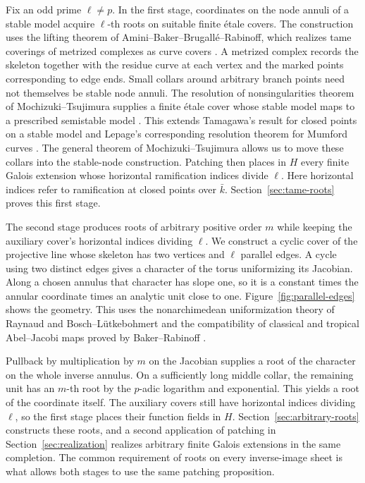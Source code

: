 Fix an odd prime $\ell\ne p$. In the first stage, coordinates on the
node annuli of a stable model acquire $\ell$-th roots on suitable
finite \'etale covers. The construction uses the lifting theorem of
Amini--Baker--Brugall\'e--Rabinoff, which realizes tame coverings of
metrized complexes as curve covers \cite[Theorem~7.7]{ABBR}.
A metrized complex records the skeleton together with the residue
curve at each vertex and the marked points corresponding to edge ends.
Small collars around arbitrary branch points need not themselves be
stable node annuli. The resolution of nonsingularities theorem of
Mochizuki--Tsujimura supplies a finite \'etale cover whose stable model
maps to a prescribed semistable model
\cite[Theorem~A and Proposition~2.4(iv)]{MochizukiTsujimura}.
This extends Tamagawa's result for closed points on a stable model
\cite[Theorem~0.2(v)]{TamagawaRNS} and Lepage's corresponding resolution
theorem for Mumford curves \cite[Theorem~2.7]{LepageRNS}.
The general theorem of Mochizuki--Tsujimura allows us to move these
collars into the stable-node construction.
Patching then places in $H$ every finite Galois extension whose
horizontal ramification indices divide $\ell$. Here horizontal
indices refer to ramification at closed points over $\bar k$.
Section~\ref{sec:tame-roots} proves this first stage.

The second stage produces roots of arbitrary positive order $m$ while
keeping the auxiliary cover's horizontal indices dividing
$\ell$. We construct a cyclic cover of the projective line whose
skeleton has two vertices and $\ell$ parallel edges. A cycle using
two distinct edges gives a character of the torus uniformizing its
Jacobian. Along a chosen annulus that character has slope one, so it
is a constant times the annular coordinate times an analytic unit
close to one. Figure~\ref{fig:parallel-edges} shows the geometry.
This uses the nonarchimedean uniformization theory of Raynaud and
Bosch--L\"utkebohmert \cite{RaynaudUniformization,BoschLutkebohmert}
and the compatibility of classical and tropical Abel--Jacobi maps
proved by Baker--Rabinoff
\cite[Proposition~6.1 and Corollary~6.6]{BakerRabinoff}.

Pullback by multiplication by $m$ on the Jacobian supplies a root of
the character on the whole inverse annulus. On a sufficiently long
middle collar, the remaining unit has an $m$-th root by the $p$-adic
logarithm and exponential. This yields a root of the coordinate itself.
The auxiliary covers still have horizontal indices dividing $\ell$,
so the first stage places their function fields in $H$.
Section~\ref{sec:arbitrary-roots} constructs these roots, and a second
application of patching in Section~\ref{sec:realization} realizes
arbitrary finite Galois extensions in the same completion.
The common requirement of roots on every inverse-image sheet is what
allows both stages to use the same patching proposition.

